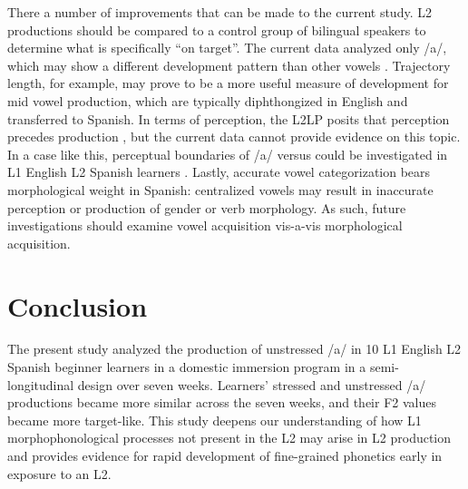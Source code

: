\documentclass[
  a4paper,
  11pt,
  twocolumn]{article}
\begin{document}
There a number of improvements that can be made to the current study. L2
productions should be compared to a control group of bilingual speakers
to determine what is specifically ``on target''. The current data
analyzed only /a/, which may show a different development pattern than
other vowels \cite{cobb2015adult}. Trajectory length, for example, may
prove to be a more useful measure of development for mid vowel
production, which are typically diphthongized in English and transferred
to Spanish. In terms of perception, the L2LP posits that perception
precedes production \cite{escudero2007second}, but the current data
cannot provide evidence on this topic. In a case like this, perceptual
boundaries of /a/ versus  could be investigated in L1
English L2 Spanish learners \cite{miller1989auditory}. Lastly, accurate
vowel categorization bears morphological weight in Spanish: centralized
vowels may result in inaccurate perception or production of gender or
verb morphology. As such, future investigations should examine vowel
acquisition vis-a-vis morphological acquisition.

\section{Conclusion}

The present study analyzed the production of unstressed /a/ in 10 L1
English L2 Spanish beginner learners in a domestic immersion program in
a semi-longitudinal design over seven weeks. Learners' stressed and
unstressed /a/ productions became more similar across the seven weeks,
and their F2 values became more target-like. This study deepens our
understanding of how L1 morphophonological processes not present in the
L2 may arise in L2 production and provides evidence for rapid
development of fine-grained phonetics early in exposure to an L2.




\theendnotes
\end{document}
